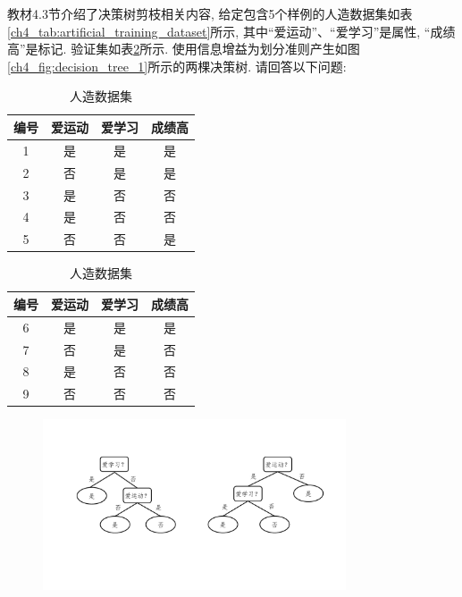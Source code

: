 \documentclass[answers]{exam}  %
\begin{document}
\begin{questions}
    教材4.3节介绍了决策树剪枝相关内容, 给定包含5个样例的人造数据集如表\ref{ch4_tab:artificial_training_dataset}所示, 其中“爱运动”、“爱学习”是属性, “成绩高”是标记. 验证集如表\ref{ch4_tab:artificial_testing_dataset}所示. 使用信息增益为划分准则产生如图\ref{ch4_fig:decision_tree_1}所示的两棵决策树. 请回答以下问题:
    \begin{table}[!htb]
        \caption{人造数据集}
        \begin{minipage}[t]{.48\linewidth}
            \label{ch4_tab:artificial_training_dataset}
            \centering
            \begin{tabular}{cccc}
                \hline 编号 & 爱运动 & 爱学习 & 成绩高 \\
                \hline 1    & 是     & 是     & 是     \\
                2           & 否     & 是     & 是     \\
                3           & 是     & 否     & 否     \\
                4           & 是     & 否     & 否     \\
                5           & 否     & 否     & 是     \\
                \hline
            \end{tabular}
        \end{minipage}%
        \begin{minipage}[t]{.48\linewidth}
            \centering
            \label{ch4_tab:artificial_testing_dataset}
            \begin{tabular}{cccc}
                \hline 编号 & 爱运动 & 爱学习 & 成绩高 \\
                \hline 6    & 是     & 是     & 是     \\
                7           & 否     & 是     & 否     \\
                8           & 是     & 否     & 否     \\
                9           & 否     & 否     & 否     \\
                \hline
            \end{tabular}
        \end{minipage}
    \end{table}
    \begin{figure}[ht]
        \centering
        \includegraphics[width=0.8\textwidth]{figure/ch4_decision_tree_1.pdf}

\end{figure}
\end{questions}
\end{document}
